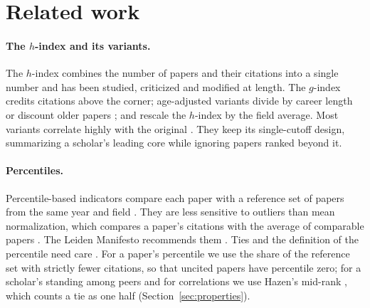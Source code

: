\documentclass[11pt]{article}
\begin{document}
\section{Related work}
\label{sec:related}

\paragraph{The $h$-index and its variants.} The $h$-index \citep{hirsch2005index} combines the number of papers and
their citations into a single number and has been studied, criticized and modified at length. The $g$-index
\citep{egghe2006theory} credits citations above the corner; age-adjusted variants divide by career length or discount
older papers \citep{hirsch2005index,sidiropoulos2007generalized,harzing2014hia}; and \citet{kaur2013universality}
rescale the $h$-index by the field average. Most variants correlate highly with the original
\citep{bornmann2011metaanalysis}. They keep its single-cutoff design, summarizing a scholar's leading core while
ignoring papers ranked beyond it.

\paragraph{Percentiles.} Percentile-based indicators compare each paper with a reference set of papers from the same
year and field \citep{bornmann2013use,leydesdorff2011turning,waltman2013percentile,bornmann2020evaluation}. They are
less sensitive to outliers \citep{bornmann2013use,bornmann2020evaluation} than mean normalization, which compares a
paper's citations with the average of comparable papers \citep{schubert1986relative,Radicchi2008}. The Leiden
Manifesto recommends them \citep{hicks2015bibliometrics}. Ties and the definition of the percentile need care
\citep{waltman2013percentile}. For a paper's percentile we use the share of the reference set with strictly fewer
citations, so that uncited papers have percentile zero; for a scholar's standing among peers and for correlations we
use Hazen's mid-rank \citep{hazen1914storage}, which counts a tie as one half (Section~\ref{sec:properties}).
\end{document}
